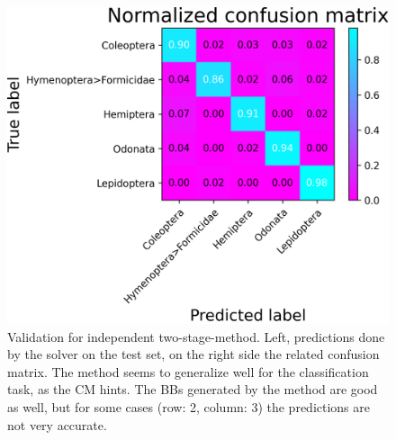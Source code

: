 \begin{figure}
\begin{multicols}{2}
\begin{minipage}{.45\textwidth}
            \includegraphics[width=\textwidth]{images/independent-model-confusion.png}
        \end{minipage}
    \end{multicols}
    \caption{Validation for independent two-stage-method. Left, predictions done by the solver on the test set, on the right side the related confusion matrix. The method seems to generalize well for the classification task, as the CM hints. The BBs generated by the method are good as well, but for some cases (row: 2, column: 3) the predictions are not very accurate.}
    \label{fig:independent-results}
\end{figure}
